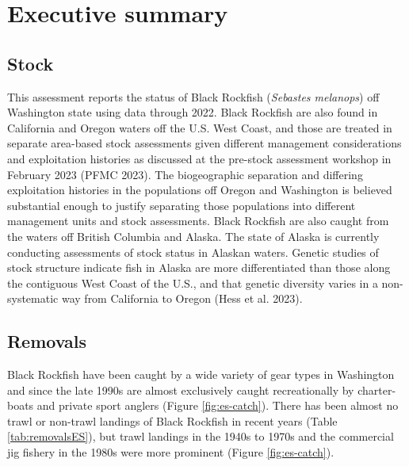 \documentclass[11pt,
  letterpaper,
]{article}
\begin{document}
\newpage

\hypertarget{executive-summary}{%
\section*{Executive summary}\label{executive-summary}}

\hypertarget{stock}{%
\subsection*{Stock}\label{stock}}

This assessment reports the status of Black Rockfish (\emph{Sebastes melanops}) off Washington state using data through 2022. Black Rockfish are also found in California and Oregon waters off the U.S. West Coast, and those are treated in separate area-based stock assessments given different management considerations and exploitation histories as discussed at the pre-stock assessment workshop in February 2023 (PFMC 2023). The biogeographic separation and differing exploitation histories in the populations off Oregon and Washington is believed substantial enough to justify separating those populations into different management units and stock assessments. Black Rockfish are also caught from the waters off British Columbia and Alaska. The state of Alaska is currently conducting assessments of stock status in Alaskan waters. Genetic studies of stock structure indicate fish in Alaska are more differentiated than those along the contiguous West Coast of the U.S., and that genetic diversity varies in a non-systematic way from California to Oregon (Hess et al. 2023).

\hypertarget{removals}{%
\subsection*{Removals}\label{removals}}

Black Rockfish have been caught by a wide variety of gear types in Washington and since the late 1990s are almost exclusively caught recreationally by charter-boats and private sport anglers (Figure \ref{fig:es-catch}). There has been almost no trawl or non-trawl landings of Black Rockfish in recent years (Table \ref{tab:removalsES}), but trawl landings in the 1940s to 1970s and the commercial jig fishery in the 1980s were more prominent (Figure \ref{fig:es-catch}).
\end{document}
